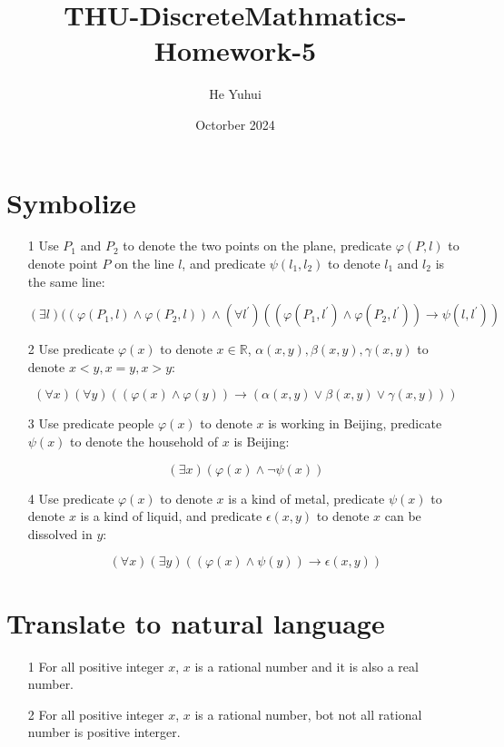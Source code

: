 \documentclass{article}
\title{THU-DiscreteMathmatics-Homework-5}
\author{He Yuhui\quad 2022012050}
\date{Octorber 2024}
\begin{document}
\maketitle

\section{Symbolize}

\begin{itemize}
    \item [1] Use $P_1$ and $P_2$ to denote the two points on the plane, predicate $\varphi(P,l)$ to denote point $P$ on the line $l$, and predicate $\psi(l_1, l_2)$ to denote $l_1$ and $l_2$ is the same line:

        $$
            (\exists l)((\varphi(P_1,l)\land\varphi(P_2,l))\land(\forall l^\prime)((\varphi(P_1, l^\prime)\land\varphi(P_2,l^\prime))\to\psi(l,l^\prime))
        $$

    \item [2] Use predicate $\varphi(x)$ to denote $x\in\mathbb{R}$, $\alpha(x,y),\beta(x,y),\gamma(x,y)$ to denote $x<y,x=y,x>y$:
    
        $$
            (\forall x)(\forall y)((\varphi(x)\land\varphi(y))\to(\alpha(x,y)\lor\beta(x,y)\lor\gamma(x,y)))
        $$

    \item [3] Use predicate people $\varphi(x)$ to denote $x$ is working in Beijing, predicate $\psi(x)$ to denote the household of $x$ is Beijing:
    
        $$
            (\exists x)(\varphi(x)\land\lnot\psi(x))
        $$

    \item [4] Use predicate $\varphi(x)$ to denote $x$ is a kind of metal, predicate $\psi(x)$ to denote $x$ is a kind of liquid, and predicate $\epsilon(x, y)$ to denote $x$ can be dissolved in $y$:

        $$
            (\forall x)(\exists y)((\varphi(x)\land\psi(y))\to\epsilon(x,y))
        $$
\end{itemize}

\section{Translate to natural language}

\begin{itemize}
    \item [1] For all positive integer $x$, $x$ is a rational number and it is also a real number.
    \item [2] For all positive integer $x$, $x$ is a rational number, bot not all rational number is positive interger.
\end{itemize}
\end{document}
